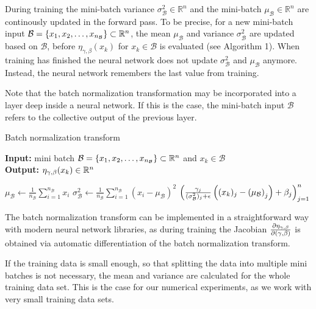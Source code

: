 \documentclass[twoside,a4paper]{article}
\begin{document}
During training the mini-batch variance $\sigma^2_\mathcal{B} \in \mathbb{R}^{n}$ and
the mini-batch $\mu_\mathcal{B} \in \mathbb{R}^{n}$ are continously updated in the forward pass.
To be precise, for a new mini-batch input
$\mathcal{B} = \{ x_1, x_2, \dots, x_{n_{\mathcal{B}}} \} \subset \mathbb{R}^n$, 
the mean $\mu_\mathcal{B}$ and variance $\sigma^2_\mathcal{B}$
are updated based on $\mathcal{B}$, before $\eta_{\gamma, \beta}(x_k)$ for
$x_k \in \mathcal{B}$ is evaluated (see Algorithm 1).
When training has finished the neural network does not update $\sigma_\mathcal{B}^2$ 
and $\mu_\mathcal{B}$ anymore. Instead, the neural network remembers the last value from training.

Note that the batch normalization transformation may be incorporated into a layer
deep inside a neural network. If this is the case, the mini-batch input $\mathcal{B}$ 
refers to the collective output of the previous layer.

\begin{algorithm}\label{algo_batch_norm}
	\caption{Batch normalization transform}
	\textbf{Input:} mini batch $\mathcal{B} = \{x_1, x_2, \dots, x_{n_\mathcal{B}}\} \subset \mathbb{R}^n$ 
	and $x_k \in \mathcal{B}$ \\
	\textbf{Output:} $\eta_{\gamma, \beta}(x_k) \in \mathbb{R}^n$
	\begin{algorithmic}
		 
			\State $\mu_\mathcal{B} \gets \frac{1}{n_\mathcal{B}} \sum_{i=1}^{n_\mathcal{B}} x_i$
			\State $\sigma^2_\mathcal{B} \gets \frac{1}{n_\mathcal{B}} \sum_{i=1}^{n_\mathcal{B}} 
			(x_i - \mu_\mathcal{B})^2$
		\EndIf
		\State \Return 
		$\left( \frac{\gamma_j}{(\sigma^2_\mathcal{B})_j + \epsilon} 
		\left( (x_k)_j - \left( \mu_\mathcal{B} \right)_j \right) + \beta_j \right)_{j=1}^n$
	\end{algorithmic}
\end{algorithm}

The batch normalization transform can be implemented in a straightforward way with modern
neural network libraries, as during training the Jacobian $\frac{\partial \eta_{\gamma, \beta}}{\partial (\gamma, \beta)}$ 
is obtained via automatic differentiation of the batch normalization transform.

If the training data is small enough, so that splitting the data into multiple mini batches
is not necessary, the mean and variance are calculated for the whole training data set. This is the
case for our numerical experiments, as we work with very small training data sets.
\end{document}
